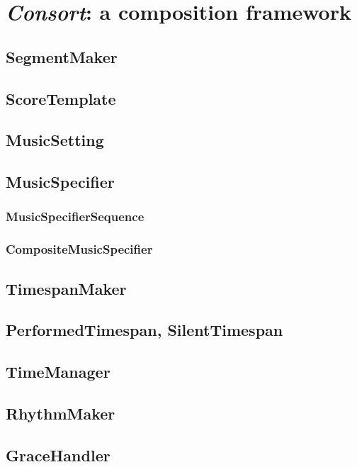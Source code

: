 \chapter{\emph{Consort}: a composition framework}

\section{SegmentMaker}

\section{ScoreTemplate}

\section{MusicSetting}

\section{MusicSpecifier}

    \subsection{MusicSpecifierSequence}

    \subsection{CompositeMusicSpecifier}

\section{TimespanMaker}

\section{PerformedTimespan, SilentTimespan}

\section{TimeManager}

\section{RhythmMaker}

\section{GraceHandler}

